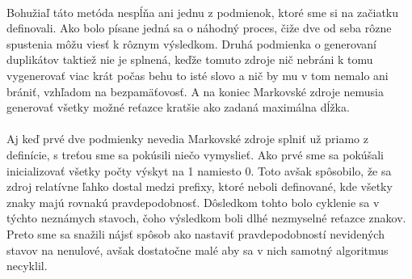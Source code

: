\paragraph{}
Bohužiaľ táto metóda nespĺňa ani jednu z podmienok, ktoré sme si na začiatku definovali. Ako bolo písane jedná sa o náhodný proces, čiže dve od seba rôzne spustenia môžu viesť k rôznym výsledkom. Druhá podmienka o generovaní duplikátov taktiež nie je splnená, keďže tomuto zdroje nič nebráni k tomu vygenerovať viac krát počas behu to isté slovo a nič by mu v tom nemalo ani brániť, vzhľadom na bezpamäťovosť. A na koniec Markovské zdroje nemusia generovať všetky možné reťazce kratšie ako zadaná maximálna dĺžka.

\paragraph{}
Aj keď prvé dve podmienky nevedia Markovské zdroje splniť už priamo z definície, s treťou sme sa pokúsili niečo vymyslieť. Ako prvé sme sa pokúšali inicializovať všetky počty výskyt na 1 namiesto 0. Toto avšak spôsobilo, že sa zdroj relatívne ľahko dostal medzi prefixy, ktoré neboli definované, kde všetky znaky majú rovnakú pravdepodobnosť. Dôsledkom tohto bolo cyklenie sa v týchto neznámych stavoch, čoho výsledkom boli dlhé nezmyselné reťazce znakov. Preto sme sa snažili nájsť spôsob ako nastaviť pravdepodobností nevidených stavov na nenulové, avšak dostatočne malé aby sa v nich samotný algoritmus necyklil.